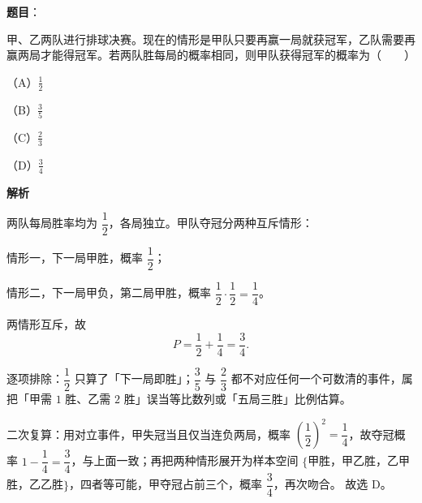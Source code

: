 \begin{answer}

\textbf{题目}：

甲、乙两队进行排球决赛。现在的情形是甲队只要再赢一局就获冠军，乙队需要再赢两局才能得冠军。若两队胜每局的概率相同，则甲队获得冠军的概率为\mbox{（　　）}

（A）$\frac12$

（B）$\frac35$

（C）$\frac23$

（D）$\frac34$

\textbf{解析}

两队每局胜率均为 $\dfrac12$，各局独立。甲队夺冠分两种互斥情形：

情形一，下一局甲胜，概率 $\dfrac12$；

情形二，下一局甲负，第二局甲胜，概率 $\dfrac12\cdot\dfrac12=\dfrac14$。

两情形互斥，故
\nopagebreak[4]
\[P=\frac12+\frac14=\frac34.\]

逐项排除：$\dfrac12$ 只算了「下一局即胜」；$\dfrac35$ 与 $\dfrac23$ 都不对应任何一个可数清的事件，属把「甲需 $1$ 胜、乙需 $2$ 胜」误当等比数列或「五局三胜」比例估算。

二次复算：用对立事件，甲失冠当且仅当连负两局，概率 $\left(\dfrac12\right)^2=\dfrac14$，故夺冠概率 $1-\dfrac14=\dfrac34$，与上面一致；再把两种情形展开为样本空间 $\{$甲胜，甲乙胜，乙甲胜，乙乙胜$\}$，四者等可能，甲夺冠占前三个，概率 $\dfrac34$，再次吻合。
故选 D。


\end{answer}

